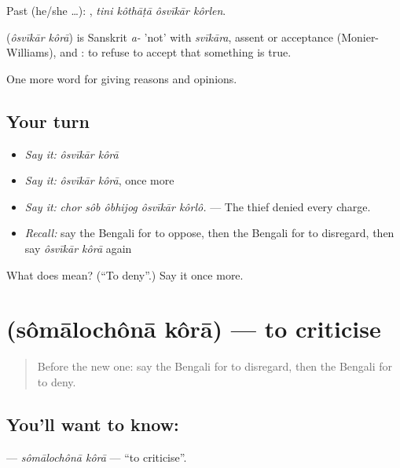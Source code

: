 Past (he/she …):    , \emph{tini kôthāṭā ôsvīkār kôrlen}.

\begin{cousinweb}
\textbf{ } (\emph{ôsvīkār kôrā}) is Sanskrit \emph{a-} 'not' with \emph{svīkāra}, assent or acceptance (Monier-Williams), and : to refuse to accept that something is true.
\end{cousinweb}

\begin{grammarlens}[title={What you've built}]
One more word for giving reasons and opinions.
\end{grammarlens}

\subsection*{Your turn}
\begin{itemize}
\raggedright
  \item \emph{Say it:} \emph{ôsvīkār kôrā}
  \item \emph{Say it:} \emph{ôsvīkār kôrā}, once more
  \item \emph{Say it:} \emph{chor sôb ôbhijog ôsvīkār kôrlô.} — The thief denied every charge.
  \item \emph{Recall:} say the Bengali for to oppose, then the Bengali for to disregard, then say \emph{ôsvīkār kôrā} again
\end{itemize}

\begin{tcolorbox}[breakable,colback=teal!4,colframe=teal!35!black,title={Before you move on}]
What does   mean? (\textquotedblleft{}To deny\textquotedblright{}.) Say it once more.
\end{tcolorbox}
\section[\texorpdfstring{\bn{সমালোচনা} \bn{করা} (sômālochônā kôrā)}{সমালোচনা করা (sômālochônā kôrā)}]{  (sômālochônā kôrā) — to criticise}

\label{lesson:BN-C335-somalochona-kora}



\begin{quote}
Before the new one: say the Bengali for to disregard, then the Bengali for to deny.
\end{quote}

\subsection*{You'll want to know:  }
\textbf{ } — \emph{sômālochônā kôrā} — \textquotedblleft{}to criticise\textquotedblright{}.

